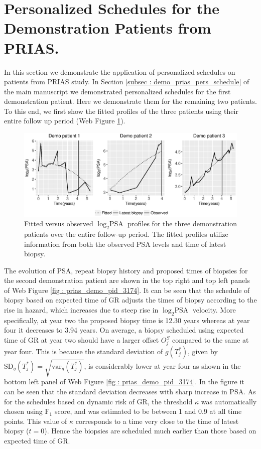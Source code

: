 \section{Personalized Schedules for the Demonstration Patients from PRIAS.}
\label{sec : demo_3174_2340}

In this section we demonstrate the application of personalized schedules on patients from PRIAS study. In Section \ref{subsec : demo_prias_pers_schedule} of the main manuscript we demonstrated personalized schedules for the first demonstration patient. Here we demonstrate them for the remaining two patients. To this end, we first show the fitted profiles of the three patients using their entire follow up period (Web Figure \ref{fig : fitted_demo_patients_t3}).

\begin{figure}[!htb]
\centerline{\includegraphics[width=\columnwidth]{images/model_fit/fitted_demo_patients_t3.eps}}
\caption{Fitted versus observed $\log_2 \mbox{PSA}$ profiles for the three demonstration patients over the entire follow-up period. The fitted profiles utilize information from both the observed PSA levels and time of latest biopsy.}
\label{fig : fitted_demo_patients_t3}
\end{figure}

The evolution of PSA, repeat biopsy history and proposed times of biopsies for the second demonstration patient are shown in the top right and top left panels of Web Figure \ref{fig : prias_demo_pid_3174}. It can be seen that the schedule of biopsy based on expected time of GR adjusts the times of biopsy according to the rise in hazard, which increases due to steep rise in $\log_2 \mbox{PSA}$ velocity. More specifically, at year two the proposed biopsy time is 12.30 years whereas at year four it decreases to 3.94 years. On average, a biopsy scheduled using expected time of GR at year two should have a larger offset $O^S_j$ compared to the same at year four. This is because the standard deviation of $g(T^*_j)$, given by $\mbox{SD}_g(T^*_j) = \sqrt{\mbox{var}_g(T^*_j)}$, is considerably lower at year four as shown in the bottom left panel of Web Figure \ref{fig : prias_demo_pid_3174}. In the figure it can be seen that the standard deviation decreases with sharp increase in PSA. As for the schedules based on dynamic risk of GR, the threshold $\kappa$ was automatically chosen using $\mbox{F}_1$ score, and was estimated to be between 1 and 0.9 at all time points. This value of $\kappa$ corresponds to a time very close to the time of latest biopsy ($t=0$). Hence the biopsies are scheduled much earlier than those based on expected time of GR.

